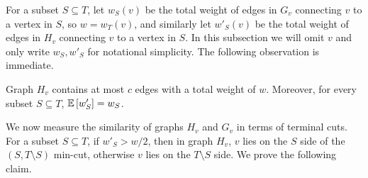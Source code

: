 For a subset $S\subseteq T$, let $w_S(v)$ be the total weight of edges in $G_v$ connecting $v$ to a vertex in $S$, so $w=w_T(v)$, and similarly let $w'_S(v)$ be the total weight of edges in $H_v$ connecting $v$ to a vertex in $S$. 
In this subsection we will omit $v$ and only write $w_S,w'_S$ for notational simplicity.
The following observation is immediate.

\begin{observation}
\label{obs: property}
Graph $H_v$ contains at most $c$ edges with a total weight of $w$. Moreover, for every subset $S\subseteq T$, ${\mathbb{E}}\left[ w'_S \right]=w_S$.
\end{observation}

We now measure the similarity of graphs $H_v$ and $G_v$ in terms of terminal cuts.
For a subset $S\subseteq T$, if $w'_S>w/2$, then in graph $H_v$, $v$ lies on the $S$ side of the $(S, T\setminus S)$ min-cut, otherwise $v$ lies on the $T\setminus S$ side. 
%
We prove the following claim.

